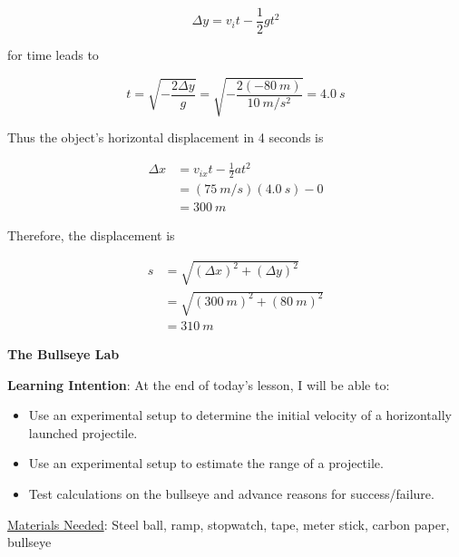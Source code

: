 \documentclass[../main-physics-problems.tex]{subfiles}
\begin{document}
\begin{questions}
\begin{solutionorbox}[5cm]
\begin{equation*}
    \Delta y = v_i t - \frac{1}{2} g t^2
\end{equation*}

for time leads to

\begin{equation*}
    t = \sqrt{-\frac{2\Delta y}{g}} = \sqrt{-\frac{2(-\SI{80}{m})}{\SI{10}{m/s^2}}} = \SI{4.0}{s}
\end{equation*}

Thus the object's horizontal displacement in 4 seconds is

\begin{align*}
    \Delta x &= v_{ix} t - \frac{1}{2} a t^2 \\[1ex]
    &= (\SI{75}{m/s})(\SI{4.0}{s}) - 0 \\[1ex]
    &= \SI{300}{m}
\end{align*}

Therefore, the displacement is

\begin{align*}
    s &= \sqrt{\left(\Delta x\right)^2 + \left(\Delta y\right)^2} \\[1ex]
    &= \sqrt{\left(\SI{300}{m}\right)^2 + \left(\SI{80}{m}\right)^2} \\[1ex]
    &= \boxed{\SI{310}{m}}
\end{align*}
\end{solutionorbox}
\end{questions}


\clearpage

{\hfill \large \textbf{The Bullseye Lab} \hfill}

\bigskip

\noindent \textbf{Learning Intention}: At the end of today's lesson, I will be able to:

\begin{itemize}[itemsep=0pt,topsep=2pt]
    \item Use an experimental setup to determine the initial velocity of a horizontally launched projectile.
    \item Use an experimental setup to estimate the range of a projectile.
    \item Test  calculations on the bullseye and advance reasons for success/failure.
\end{itemize}

\medskip

\noindent  \underline{Materials Needed}: Steel ball, ramp, stopwatch, tape, meter stick, carbon paper, bullseye
\end{document}
